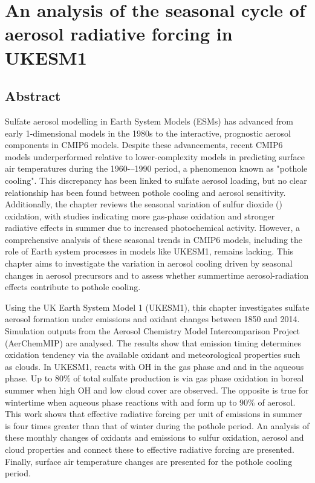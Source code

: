 
\chapter{An analysis of the seasonal cycle of aerosol radiative forcing in UKESM1}
\label{ch4:title}

\section*{Abstract}

Sulfate aerosol modelling in Earth System Models (ESMs) has advanced from early 1-dimensional models in the 1980s to the interactive, prognostic aerosol components in CMIP6 models. Despite these advancements, recent CMIP6 models underperformed relative to lower-complexity models in predicting surface air temperatures during the 1960-–1990 period, a phenomenon known as "pothole cooling". This discrepancy has been linked to sulfate aerosol loading, but no clear relationship has been found between pothole cooling and aerosol sensitivity. Additionally, the chapter reviews the seasonal variation of sulfur dioxide () oxidation, with studies indicating more gas-phase oxidation and stronger radiative effects in summer due to increased photochemical activity. However, a comprehensive analysis of these seasonal trends in CMIP6 models, including the role of Earth system processes in models like UKESM1, remains lacking. This chapter aims to investigate the variation in aerosol cooling driven by seasonal changes in aerosol precursors and to assess whether summertime aerosol-radiation effects contribute to pothole cooling. 

Using the UK Earth System Model 1 (UKESM1), this chapter investigates sulfate aerosol formation under emissions and oxidant changes between 1850 and 2014. Simulation outputs from the Aerosol Chemistry Model Intercomparison Project (AerChemMIP) are analysed. The results show that emission timing determines oxidation tendency via the available oxidant and meteorological properties such as clouds. In UKESM1,  reacts with OH in the gas phase and  and  in the aqueous phase. Up to 80\% of total sulfate production is via gas phase oxidation in boreal summer when high OH and low cloud cover are observed. The opposite is true for wintertime when aqueous phase reactions with  and  form up to 90\% of aerosol. This work shows that effective radiative forcing per unit of  emissions in summer is four times greater than that of winter during the pothole period. An analysis of these monthly changes of oxidants and emissions to sulfur oxidation, aerosol and cloud properties and connect these to effective radiative forcing are presented. Finally, surface air temperature changes are presented for the pothole cooling period. 


